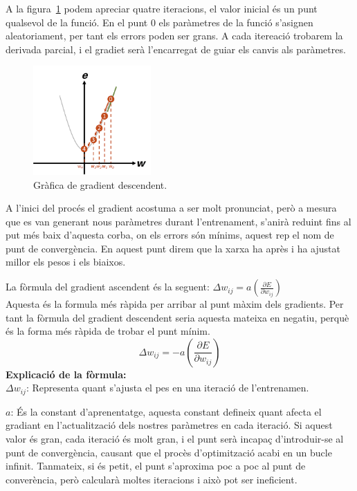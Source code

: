           A la figura~\ref{GraficaDescendet} podem apreciar quatre iteracions, el valor inicial és un punt qualsevol de la funció. En el punt 0 els paràmetres de la funció s'asignen aleatoriament, per tant els errors poden ser grans. A cada itereació  trobarem la derivada parcial, i el gradiet serà l'encarregat de guiar els canvis als paràmetres.

        \begin{figure}[h]
         \centering
         \includegraphics[width=0.4\textwidth]{./figures/gradient_descendent.png}
        \caption{Gràfica de gradient descendent.~\cite{Img_gradient}}
        \label{GraficaDescendet}
         \end{figure}

          A l'inici del procés el gradient acostuma a ser molt pronunciat, però a mesura que es van generant nous paràmetres durant l'entrenament, s'anirà reduint fins al put més baix d'aquesta corba, on els errors són mínims, aquest rep el nom de punt de convergència. En aquest punt direm que la xarxa ha après i ha ajustat millor els pesos i els biaixos.

          La fòrmula del gradient ascendent és la seguent: $\Delta w_{ij} = a \left( \frac{\partial E}{\partial w_{ij}} \right)$\\

          Aquesta és la formula més ràpida per arribar al punt màxim dels gradients. Per tant la fòrmula del gradient descendent seria aquesta mateixa en negatiu, perquè és la forma més ràpida de trobar el punt mínim.
          $$\Delta w_{ij} = -a \left( \frac{\partial E}{\partial w_{ij}} \right)$$
          \textbf{Explicació de la fòrmula:}\\
           $\Delta w_{ij}$: Representa quant s'ajusta el pes en una iteració de l'entrenamen.

           $a$: És la constant d'aprenentatge, aquesta constant defineix quant afecta el gradiant en l'actualització dels nostres paràmetres en cada iteració. Si aquest valor és gran, cada iteració és molt gran, i el punt serà incapaç d'introduir-se al punt de convergència, causant que el procès d'optimització acabi en un bucle infinit. Tanmateix, si és petit, el punt s'aproxima poc a poc al punt de converència, però calcularà moltes iteracions i això pot ser ineficient.

